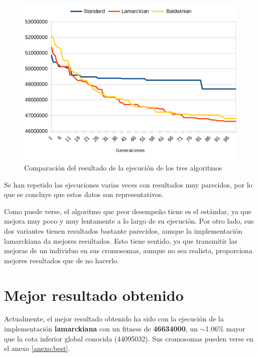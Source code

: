 \begin{figure}[H]
  \centering
  \includegraphics[width=1\textwidth]{../images/comparacion-3}
  \caption{Comparación del resultado de la ejecución de los tres algoritmos}
  \label{fig:comparacion-3}
\end{figure}

Se han repetido las ejecuciones varias veces con resultados muy parecidos, por lo que se concluye que estos datos son representativos.

Como puede verse, el algoritmo que peor desempeño tiene es el estándar, ya que mejora muy poco y muy lentamente a lo largo de su ejecución. Por otro lado, sus dos variantes tienen resultados bastante parecidos, aunque la implementación lamarckiana da mejores resultados. Esto tiene sentido, ya que transmitir las mejoras de un individuo en sus cromosomas, aunque no sea realista, proporciona mejores resultados que de no hacerlo.


\section{Mejor resultado obtenido}

Actualmente, el mejor resultado obtenido ha sido con la ejecución de la implementación \textbf{lamarckiana} con un fitness de \textbf{46634000}, un $\sim$1.06\% mayor que la cota inferior global conocida (44095032). Sus cromosomas pueden verse en el anexo \ref{anexo:best}.